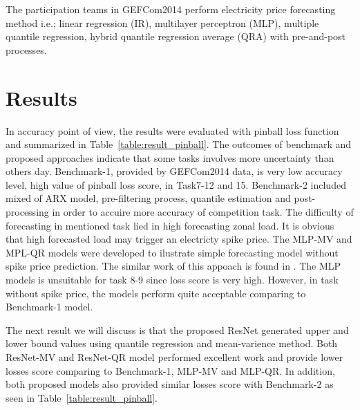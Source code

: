 \documentclass[review]{elsarticle}
\begin{document}
      The participation teams in GEFCom2014 perform electricity price forecasting method i.e.; linear regression (IR)\cite{Dudek2016}, multilayer perceptron (MLP)\cite{Dudek2016},  multiple quantile regression\cite{Juban2016}, hybrid quantile regression average (QRA) with pre-and-post processes\cite{Maciejowska2016}.

  \section{Results}
    In accuracy point of view, the results were evaluated with pinball loss function and summarized in Table~\ref{table:result_pinball}.
    The outcomes of benchmark and proposed approaches indicate that some tasks involves more uncertainty than others day.
    Benchmark-1, provided by GEFCom2014 data, is very low accuracy level, high value of pinball loss score, in Task7-12 and 15.
    Benchmark-2 included mixed of ARX model, pre-filtering process, quantile estimation and post-processing in order to accuire more accuracy of competition task.
    The difficulty of forecasting in mentioned task lied in high forecasting zonal load.
    It is obvious that high forecasted load may trigger an electricty spike price.
    The MLP-MV and MPL-QR models were developed to ilustrate simple forecasting model without spike price prediction.
    The similar work of this appoach is found in \cite{Dudek2016}.
    The MLP models is unsuitable for task 8-9 since loss score is very high.
    However, in task without spike price, the models perform quite acceptable comparing to Benchmark-1 model.

    The next result we will discuss is that the proposed ResNet generated upper and lower bound values using quantile regression and mean-varience method.
    Both ResNet-MV and ResNet-QR model performed excellent work and provide lower losses score comparing to Benchmark-1, MLP-MV and MLP-QR.
    In addition, both proposed models also provided similar losses score with Benchmark-2 as seen in Table~\ref{table:result_pinball}.
\end{document}
